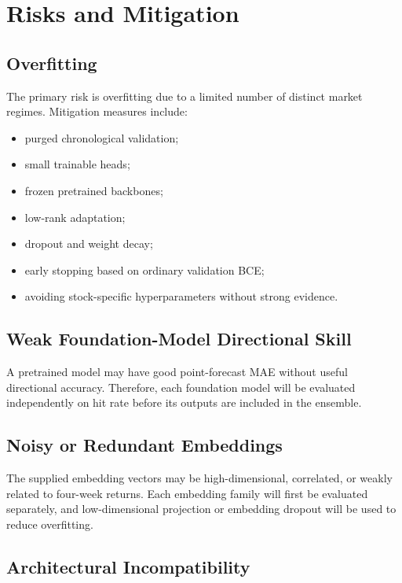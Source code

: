 \documentclass[11pt]{article}
\begin{document}
\section{Risks and Mitigation}

\subsection{Overfitting}

The primary risk is overfitting due to a limited number of distinct market
regimes. Mitigation measures include:

\begin{itemize}
    \item purged chronological validation;
    \item small trainable heads;
    \item frozen pretrained backbones;
    \item low-rank adaptation;
    \item dropout and weight decay;
    \item early stopping based on ordinary validation BCE;
    \item avoiding stock-specific hyperparameters without strong evidence.
\end{itemize}

\subsection{Weak Foundation-Model Directional Skill}

A pretrained model may have good point-forecast MAE without useful directional
accuracy. Therefore, each foundation model will be evaluated independently on
hit rate before its outputs are included in the ensemble.

\subsection{Noisy or Redundant Embeddings}

The supplied embedding vectors may be high-dimensional, correlated, or weakly
related to four-week returns. Each embedding family will first be evaluated
separately, and low-dimensional projection or embedding dropout will be used
to reduce overfitting.

\subsection{Architectural Incompatibility}
\end{document}
